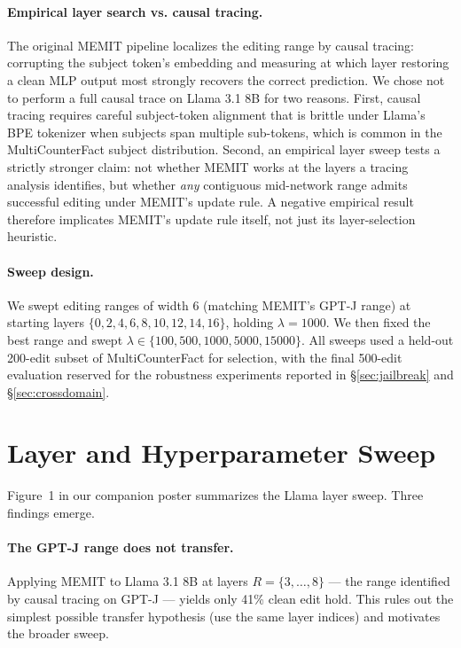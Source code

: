 \paragraph{Empirical layer search vs. causal tracing.}
The original MEMIT pipeline localizes the editing range by causal tracing: corrupting the subject token's embedding and measuring at which layer restoring a clean MLP output most strongly recovers the correct prediction. We chose not to perform a full causal trace on Llama 3.1 8B for two reasons. First, causal tracing requires careful subject-token alignment that is brittle under Llama's BPE tokenizer when subjects span multiple sub-tokens, which is common in the MultiCounterFact subject distribution. Second, an empirical layer sweep tests a strictly stronger claim: not whether MEMIT works at the layers a tracing analysis identifies, but whether \emph{any} contiguous mid-network range admits successful editing under MEMIT's update rule. A negative empirical result therefore implicates MEMIT's update rule itself, not just its layer-selection heuristic.

\paragraph{Sweep design.}
We swept editing ranges of width 6 (matching MEMIT's GPT-J range) at starting layers $\{0, 2, 4, 6, 8, 10, 12, 14, 16\}$, holding $\lambda = 1000$. We then fixed the best range and swept $\lambda \in \{100, 500, 1000, 5000, 15000\}$. All sweeps used a held-out 200-edit subset of MultiCounterFact for selection, with the final 500-edit evaluation reserved for the robustness experiments reported in \S\ref{sec:jailbreak} and \S\ref{sec:crossdomain}.


\section{Layer and Hyperparameter Sweep}
\label{sec:sweep}

Figure~1 in our companion poster summarizes the Llama layer sweep. Three findings emerge.

\paragraph{The GPT-J range does not transfer.}
Applying MEMIT to Llama 3.1 8B at layers $R = \{3, \dots, 8\}$ — the range identified by causal tracing on GPT-J — yields only 41\% clean edit hold. This rules out the simplest possible transfer hypothesis (use the same layer indices) and motivates the broader sweep.

